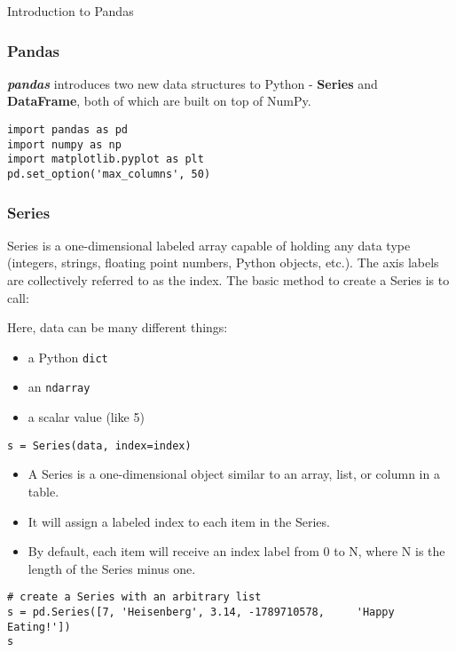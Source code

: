 
\begin{frame}
  \begin{center}
    {\Large Introduction to Pandas}
  \end{center}
\end{frame}

\begin{frame}[fragile]\frametitle{Pandas}	
\textbf{\textit{pandas}} introduces two new data structures to Python - \textbf{Series} and \textbf{DataFrame}, both of which are built on top of NumPy.
\begin{lstlisting}
import pandas as pd
import numpy as np
import matplotlib.pyplot as plt
pd.set_option('max_columns', 50)
\end{lstlisting}
\end{frame}

\begin{frame}[fragile]\frametitle{Series}
Series is a one-dimensional labeled array capable of holding any data type (integers, strings, floating point numbers, Python objects, etc.). The axis labels are collectively referred to as the index. The basic method to create a Series is to call:

 Here, data can be many different things:
\begin{itemize}
\item a Python \texttt{dict}
\item an \texttt{ndarray}
\item a scalar value (like 5)
\end{itemize}

\begin{lstlisting}
s = Series(data, index=index)
\end{lstlisting}
\end{frame}

\begin{frame}[fragile]
\begin{itemize}
\item A Series is a one-dimensional object similar to an array, list, or column in a table. 
\item It will assign a labeled index to each item in the Series. \item By default, each item will receive an index label from 0 to N, where N is the length of the Series minus one.
\end{itemize}
\begin{lstlisting}
# create a Series with an arbitrary list
s = pd.Series([7, 'Heisenberg', 3.14, -1789710578,     'Happy Eating!'])
s
\end{lstlisting}
\end{frame}

